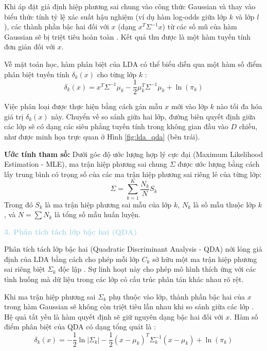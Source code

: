 Khi áp đặt giả định hiệp phương sai chung vào công thức Gaussian và thay vào biểu thức tính tỷ lệ xác suất hậu nghiệm (ví dụ hàm log-odds giữa lớp $k$ và lớp $l$), các thành phần bậc hai đối với $x$ (dạng $x^T \Sigma^{-1} x$) từ các số mũ của hàm Gaussian sẽ bị triệt tiêu hoàn toàn \cite{bishop2006pattern}. Kết quả thu được là một hàm tuyến tính đơn giản đối với $x$.

Về mặt toán học, hàm phân biệt của LDA có thể biểu diễn qua một hàm số điểm phân biệt tuyến tính $\delta_k(x)$ cho từng lớp $k$ \cite{welling2005fisher, tezekbayev2019linear}:
\begin{equation}
    \delta_k(x) = x^T \Sigma^{-1} \mu_k - \frac{1}{2} \mu_k^T \Sigma^{-1} \mu_k + \ln(\pi_k)
\end{equation}

Việc phân loại được thực hiện bằng cách gán mẫu $x$ mới vào lớp $k$ nào tối đa hóa giá trị $\delta_k(x)$ này. Chuyển vế so sánh giữa hai lớp, đường biên quyết định giữa các lớp sẽ có dạng các siêu phẳng tuyến tính trong không gian đầu vào $D$ chiều, như được minh họa trực quan ở Hình \ref{fig:lda_qda} (bên trái).

\textbf{Ước tính tham số:}
Dưới góc độ ước lượng hợp lý cực đại (Maximum Likelihood Estimation - MLE), ma trận hiệp phương sai chung $\Sigma$ được ước lượng bằng cách lấy trung bình có trọng số của các ma trận hiệp phương sai riêng lẻ của từng lớp:
\begin{equation}
    \Sigma = \sum_{k=1}^K \frac{N_k}{N} S_k
\end{equation}
Trong đó $S_k$ là ma trận hiệp phương sai mẫu của lớp $k$, $N_k$ là số mẫu thuộc lớp $k$, và $N = \sum N_k$ là tổng số mẫu huấn luyện.

\vspace{0.5em}
\noindent\textcolor{lightblue}{\textbf{3. Phân tích tách lớp bậc hai (QDA)}}
\vspace{0.5em}

Phân tích tách lớp bậc hai (Quadratic Discriminant Analysis - QDA) nới lỏng giả định của LDA bằng cách cho phép mỗi lớp $C_k$ sở hữu một ma trận hiệp phương sai riêng biệt $\Sigma_k$ độc lập \cite{welling2005fisher, tezekbayev2019linear}. Sự linh hoạt này cho phép mô hình thích ứng với các tình huống mà dữ liệu trong các lớp có cấu trúc phân tán khác nhau rõ rệt.

Khi ma trận hiệp phương sai $\Sigma_k$ phụ thuộc vào lớp, thành phần bậc hai của $x$ trong hàm Gaussian sẽ không còn triệt tiêu lẫn nhau khi so sánh giữa các lớp \cite{tezekbayev2019linear}. Hệ quả tất yếu là hàm quyết định sẽ giữ nguyên dạng bậc hai đối với $x$. Hàm số điểm phân biệt của QDA có dạng tổng quát là \cite{tezekbayev2019linear}:
\begin{equation}
    \delta_k(x) = -\frac{1}{2} \ln|\Sigma_k| - \frac{1}{2} (x-\mu_k)^T \Sigma_k^{-1} (x-\mu_k) + \ln(\pi_k)
\end{equation}

